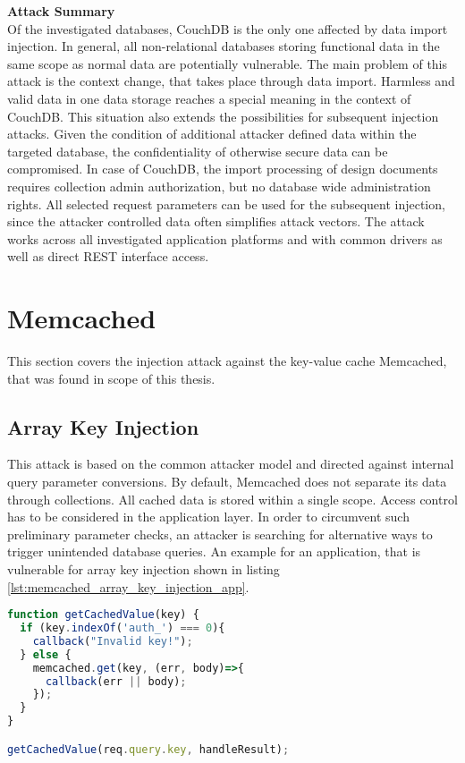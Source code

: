 \textbf{Attack Summary} \\
Of the investigated databases, CouchDB is the only one affected by data import injection. In general, all non-relational databases storing functional data in the same scope as normal data are potentially vulnerable. The main problem of this attack is the context change, that takes place through data import. Harmless and valid data in one data storage reaches a special meaning in the context of CouchDB. This situation also extends the possibilities for subsequent injection attacks. Given the condition of additional attacker defined data within the targeted database, the confidentiality of otherwise secure data can be compromised. In case of CouchDB, the import processing of design documents requires collection admin authorization, but no database wide administration rights. All selected request parameters can be used for the subsequent injection, since the attacker controlled data often simplifies attack vectors. The attack works across all investigated application platforms and with common drivers as well as direct REST interface access. 

\section{Memcached}
This section covers the injection attack against the key-value cache Memcached, that was found in scope of this thesis.
\subsection{Array Key Injection}
This attack is based on the common attacker model and directed against internal query parameter conversions. By default, Memcached does not separate its data through collections. All cached data is stored within a single scope. Access control has to be considered in the application layer. In order to circumvent such preliminary parameter checks, an attacker is searching for alternative ways to trigger unintended database queries. An example for an application, that is vulnerable for array key injection shown in listing \ref{lst:memcached_array_key_injection_app}.\\

\begin{lstlisting}[caption={Vulnerable NodeJS example for array key injection against Memcached}, label={lst:memcached_array_key_injection_app}, language=JavaScript]
function getCachedValue(key) {
  if (key.indexOf('auth_') === 0){
    callback("Invalid key!");
  } else {
    memcached.get(key, (err, body)=>{
      callback(err || body);
    });
  }
}

getCachedValue(req.query.key, handleResult);
\end{lstlisting}

